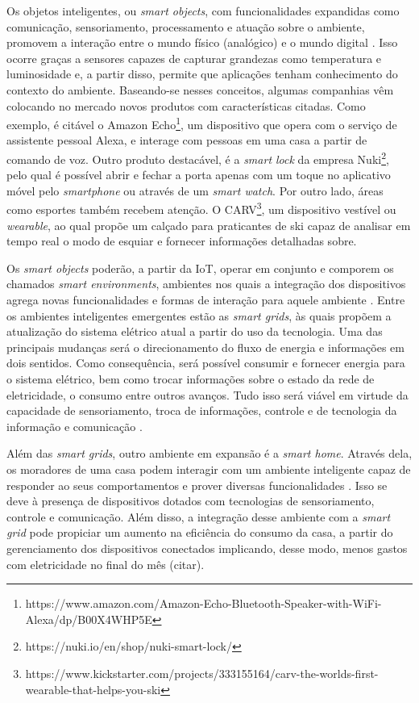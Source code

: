Os objetos inteligentes, ou \textit{smart objects}, com funcionalidades expandidas como comunicação, sensoriamento, processamento e atuação sobre o ambiente, promovem a interação entre o mundo físico (analógico) e o mundo digital \cite{Stojkoska2017}. Isso ocorre graças a sensores capazes de capturar grandezas como temperatura e luminosidade e, a partir disso, permite que aplicações tenham conhecimento do contexto do ambiente. Baseando-se nesses conceitos, algumas companhias vêm colocando no mercado novos produtos com características citadas. Como exemplo, é citável o Amazon Echo\textsuperscript{\textregistered}\footnote{https://www.amazon.com/Amazon-Echo-Bluetooth-Speaker-with-WiFi-Alexa/dp/B00X4WHP5E}, um dispositivo que opera com o serviço de assistente pessoal Alexa, e interage com pessoas em uma casa a partir de comando de voz. Outro produto destacável, é a \textit{smart lock} da empresa Nuki\textsuperscript{\textregistered}\footnote{https://nuki.io/en/shop/nuki-smart-lock/}, pelo qual é possível abrir e fechar a porta apenas com um toque no aplicativo móvel pelo \textit{smartphone} ou através de um \textit{smart watch}. Por outro lado, áreas como esportes também recebem atenção. O CARV\textsuperscript{\textregistered}\footnote{https://www.kickstarter.com/projects/333155164/carv-the-worlds-first-wearable-that-helps-you-ski}, um dispositivo vestível ou \textit{wearable}, ao qual propõe um calçado para praticantes de ski capaz de analisar em tempo real o modo de esquiar e fornecer informações detalhadas sobre.

Os \textit{smart objects} poderão, a partir da IoT, operar em conjunto e comporem os chamados \textit{smart environments}, ambientes nos quais a integração dos dispositivos agrega novas funcionalidades e formas de interação para aquele ambiente \cite{Asano2016}. Entre os ambientes inteligentes emergentes estão as \textit{smart grids}, às quais propõem a atualização do sistema elétrico atual a partir do uso da tecnologia. Uma das principais mudanças será o direcionamento do fluxo de energia e informações em dois sentidos. Como consequência, será possível consumir e fornecer energia para o sistema elétrico, bem como trocar informações sobre o estado da rede de eletricidade, o consumo entre outros avanços. Tudo isso será viável em virtude da capacidade de sensoriamento, troca de informações, controle e de tecnologia da informação e comunicação \cite{Cecilia2016}.  

Além das \textit{smart grids}, outro ambiente em expansão é a \textit{smart home}. Através dela, os moradores de uma casa podem interagir com um ambiente inteligente capaz de responder ao seus comportamentos e prover diversas funcionalidades \cite{DeSilva2012}. Isso se deve à presença de dispositivos dotados com tecnologias de sensoriamento, controle e comunicação. Além disso, a integração desse ambiente com a \textit{smart grid} pode propiciar um aumento na eficiência do consumo da casa, a partir do gerenciamento dos dispositivos conectados implicando, desse modo, menos gastos com eletricidade no final do mês (citar). %

